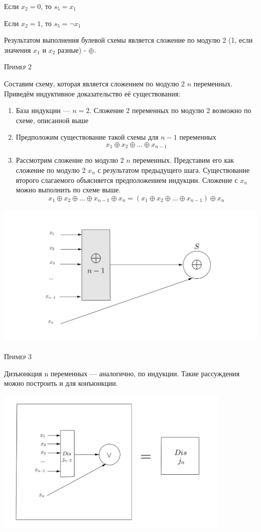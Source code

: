 \documentclass[a4paper, 12pt]{article}
\begin{document}
 Если $x_2 = 0$, то $s_5 = x_1$
  
 Если $x_2 = 1$, то $s_5 = \lnot x_1$
 
 Результатом выполнения булевой схемы является сложение по модулю 2 (1, если значения $x_1$ и $x_2$ разные) - $\oplus$.
 
 \textsc{Пример 2}
 
 Составим схему, которая является сложением по модулю 2 $n$ переменных. Приведём индуктивное доказательство её существования: 
 
 \begin{enumerate}
     \item База индукции --- $n = 2$. Сложение 2 переменных по модулю 2 возможно по схеме, описанной выше
     \item Предположим существование такой схемы для $n - 1$ переменных 
     \[x_1 \oplus x_2 \oplus \ldots \oplus x_{n-1}\]
     \item Рассмотрим сложение по модулю 2 $n$ переменных. Представим его как сложение по модулю 2 $x_n$ с результатом предыдущего шага. Существование второго слагаемого объясняется предположением индукции. Сложение с $x_n$ можно выполнить по схеме выше. 
     \[x_1 \oplus x_2 \oplus \ldots \oplus x_{n-1} \oplus x_n = (x_1 \oplus x_2 \oplus \ldots \oplus x_{n-1}) \oplus x_n\]
 \end{enumerate}
\includegraphics[height=7cm]{Images/2.png}
 
 \textsc{Пример 3}
 
 Дизъюнкция n переменных --- аналогично, по индукции. Такие рассуждения можно построить и для конъюнкции.
 
 \includegraphics[height=7cm]{Images/3.png}
 
\end{document}
